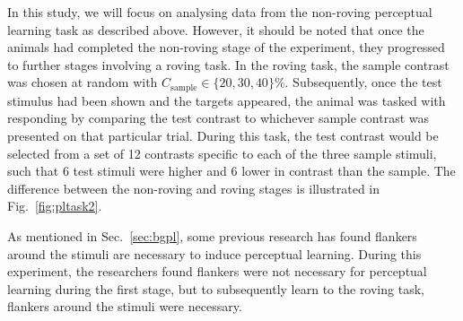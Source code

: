 
In this study, we will focus on analysing data from the non-roving perceptual learning task as described above.
However, it should be noted that once the animals had completed the non-roving stage of the experiment, they progressed to further stages involving a roving task.
In the roving task, the sample contrast was chosen at random with $C_\text{sample} \in \{20, 30, 40\}\%$.
Subsequently, once the test stimulus had been shown and the targets appeared, the animal was tasked with responding by comparing the test contrast to whichever sample contrast was presented on that particular trial.
During this task, the test contrast would be selected from a set of 12 contrasts specific to each of the three sample stimuli, such that 6 test stimuli were higher and 6 lower in contrast than the sample.
The difference between the non-roving and roving stages is illustrated in Fig.~\ref{fig:pltask2}.
%

As mentioned in Sec.~\ref{sec:bgpl}, some previous research has found flankers around the stimuli are necessary to induce perceptual learning.
During this experiment, the researchers found flankers were not necessary for perceptual learning during the first stage, but to subsequently learn to the roving task, flankers around the stimuli were necessary.

